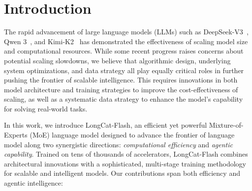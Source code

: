 \documentclass{article}
\newcommand{\longcat}{LongCat-Flash\xspace}
\newcommand{\chip}{accelerators\xspace}
\begin{document}
\clearpage
\tableofcontents
\clearpage

\section{Introduction}


The rapid advancement of large language models (LLMs) such as DeepSeek-V3~\citep{deepseekai2025deepseekv3technicalreport}, Qwen 3~\citep{yang2025qwen3}, and Kimi-K2~\citep{team2025kimi} has demonstrated the effectiveness of scaling model size and computational resources. While some recent progress raises concerns about potential scaling slowdowns, we believe that algorithmic design, underlying system optimizations, and data strategy all play equally critical roles in further pushing the frontier of scalable intelligence. This requires innovations in both model architecture and training strategies to improve the cost-effectiveness of scaling, as well as a systematic data strategy to enhance the model's capability for solving real-world tasks.



In this work, we introduce \longcat, an efficient yet powerful Mixture-of-Experts (MoE) language model designed to advance the frontier of language model along two synergistic directions: \emph{computational efficiency} and \emph{agentic capability}. Trained on tens of thousands of \chip, \longcat combines architectural innovations with a sophisticated, multi-stage training methodology for scalable and intelligent models. Our contributions span both efficiency and agentic intelligence:
\end{document}
